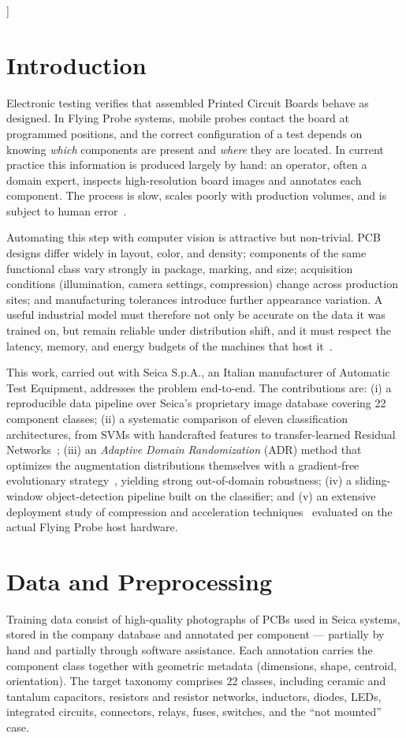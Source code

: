 \documentclass[10pt,twocolumn,a4paper]{article}
\begin{document}
\vspace{14pt}
]

\section{Introduction}
Electronic testing verifies that assembled Printed Circuit Boards behave as designed. In Flying Probe systems, mobile probes contact the board at programmed positions, and the correct configuration of a test depends on knowing \emph{which} components are present and \emph{where} they are located. In current practice this information is produced largely by hand: an operator, often a domain expert, inspects high-resolution board images and annotates each component. The process is slow, scales poorly with production volumes, and is subject to human error~\cite{taha2014aoi}.

Automating this step with computer vision is attractive but non-trivial. PCB designs differ widely in layout, color, and density; components of the same functional class vary strongly in package, marking, and size; acquisition conditions (illumination, camera settings, compression) change across production sites; and manufacturing tolerances introduce further appearance variation. A useful industrial model must therefore not only be accurate on the data it was trained on, but remain reliable under distribution shift, and it must respect the latency, memory, and energy budgets of the machines that host it~\cite{sze2017efficient}.

This work, carried out with Seica S.p.A., an Italian manufacturer of Automatic Test Equipment, addresses the problem end-to-end. The contributions are: (i) a reproducible data pipeline over Seica's proprietary image database covering 22 component classes; (ii) a systematic comparison of eleven classification architectures, from SVMs with handcrafted features to transfer-learned Residual Networks~\cite{he2016resnet}; (iii) an \emph{Adaptive Domain Randomization} (ADR) method that optimizes the augmentation distributions themselves with a gradient-free evolutionary strategy~\cite{augerhansen2012cma}, yielding strong out-of-domain robustness; (iv) a sliding-window object-detection pipeline built on the classifier; and (v) an extensive deployment study of compression and acceleration techniques~\cite{han2015deepcompression,krishnamoorthi2018quant} evaluated on the actual Flying Probe host hardware.

\section{Data and Preprocessing}
Training data consist of high-quality photographs of PCBs used in Seica systems, stored in the company database and annotated per component --- partially by hand and partially through software assistance. Each annotation carries the component class together with geometric metadata (dimensions, shape, centroid, orientation). The target taxonomy comprises 22 classes, including ceramic and tantalum capacitors, resistors and resistor networks, inductors, diodes, LEDs, integrated circuits, connectors, relays, fuses, switches, and the ``not mounted'' case.
\end{document}
